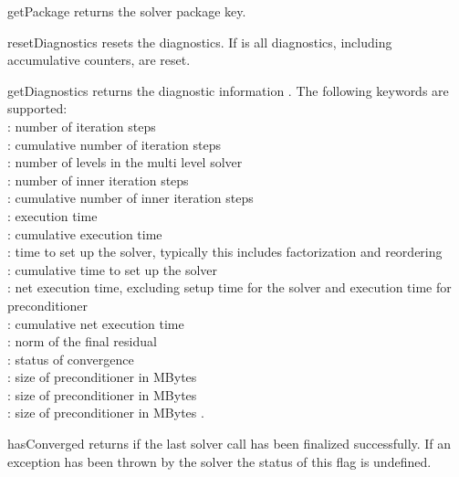 \begin{methoddesc}[SolverOptions]{getPackage}{}
returns the solver package key.
\end{methoddesc}

\begin{methoddesc}[SolverOptions]{resetDiagnostics}{}
resets the diagnostics. If  is \True all diagnostics, including
accumulative counters, are reset.
\end{methoddesc}

\begin{methoddesc}[SolverOptions]{getDiagnostics}{}
returns the diagnostic information . The following keywords are
supported:\\
 : number of iteration steps\\
 : cumulative number of iteration steps\\
 : number of levels in the multi level solver\\
 : number of inner iteration steps\\
 : cumulative number of inner iteration steps\\
 : execution time\\
 : cumulative execution time\\
 : time to set up the solver, typically this includes
 factorization and reordering\\
 : cumulative time to set up the solver\\
 : net execution time, excluding setup time for the solver
 and execution time for preconditioner\\
 : cumulative net execution time\\
 : norm of the final residual\\
 : status of convergence\\
 : size of preconditioner in MBytes \\
 : size of preconditioner in MBytes \\
 : size of preconditioner in MBytes .
 
\end{methoddesc}

\begin{methoddesc}[SolverOptions]{hasConverged}{}
returns \True if the last solver call has been finalized successfully.
If an exception has been thrown by the solver the status of this flag is undefined.
\end{methoddesc}


